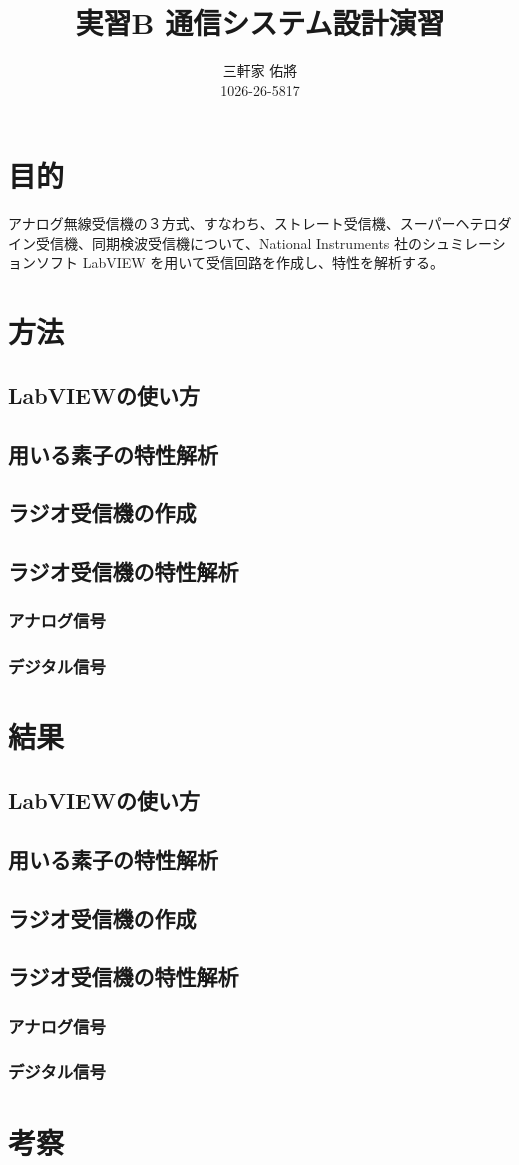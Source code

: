 \documentclass[11pt]{ltjsarticle}
\title{実習B 通信システム設計演習}
\author{三軒家 佑將 \\ 1026-26-5817}
\date{}
\begin{document}
\maketitle

\section{目的}
	アナログ無線受信機の３方式、すなわち、ストレート受信機、スーパーヘテロダイン受信機、同期検波受信機について、National Instruments 社のシュミレーションソフト LabVIEW を用いて受信回路を作成し、特性を解析する。
\section{方法}
	\subsection{LabVIEWの使い方}
	\subsection{用いる素子の特性解析}
	\subsection{ラジオ受信機の作成}
	\subsection{ラジオ受信機の特性解析}
		\subsubsection{アナログ信号}
		\subsubsection{デジタル信号}
\section{結果} %
	\subsection{LabVIEWの使い方}
	\subsection{用いる素子の特性解析}
	\subsection{ラジオ受信機の作成}
	\subsection{ラジオ受信機の特性解析}
		\subsubsection{アナログ信号}
		\subsubsection{デジタル信号}
\section{考察} %
\end{document}
